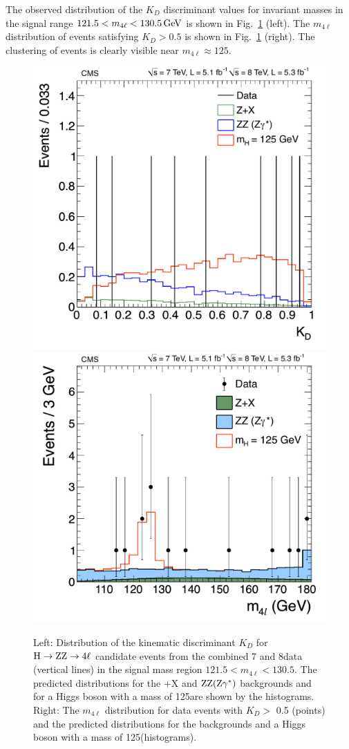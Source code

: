 \documentclass[11pt,twoside,a4paper,cmspaper,final,collab]{cms-tdr}
\begin{document}
The observed distribution of the $K_{D}$ discriminant values for invariant masses in
the signal range $121.5 < m_{4\ell} < 130.5\,\text{Ge\hspace{-.08em}V}$ is shown
in Fig.~\ref{fig:Mass4lKD05} (left).
The $m_{4\ell}$ distribution of events satisfying $K_{D} > 0.5$ is shown
in Fig.~\ref{fig:Mass4lKD05} (right). The clustering of events is clearly visible near $m_{4\ell}$$\approx$$125$\GeV.
\begin{figure}[!htb]
\begin{center}
\includegraphics[width=0.49\linewidth]{figures/HZZ_LD_lowmass_7Plus8TeV}
\includegraphics[width=0.5\linewidth]{figures/HZZ_Mass_7Plus8TeV_100-180_Mela05}
\caption{
Left: Distribution of the kinematic discriminant $K_D$ for $\mathrm{H} \to \mathrm{Z}\mathrm{Z} \to  4\ell$ candidate events
from the combined 7  and 8\TeV data (vertical lines) in the signal mass region $121.5 < m_{4\ell} < 130.5$\GeV.
The predicted distributions for the \cPZ+X and $\mathrm{Z}\mathrm{Z}(\mathrm{Z}\gamma^*)$ backgrounds and for a Higgs boson
with a mass of 125\GeV are shown by the histograms.
Right: The $m_{4\ell}$ distribution for data events with $K_D >$ 0.5 (points) and the predicted distributions
for the backgrounds and a Higgs boson with a mass of 125\GeV (histograms).
}
\label{fig:Mass4lKD05}
\end{center}
\end{figure}
\end{document}
